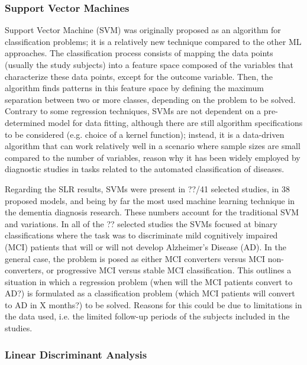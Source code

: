 \subsubsection{Support Vector Machines}
Support Vector Machine (SVM) was originally proposed as an algorithm for classification problems; it is a relatively new technique compared to the other ML approaches. The classification process consists of mapping the data points (usually the study subjects) into a feature space composed of the variables that characterize these data points, except for the outcome variable. Then, the algorithm finds patterns in this feature space by defining the maximum separation between two or more classes, depending on the problem to be solved. Contrary to some regression techniques, SVMs are not dependent on a pre-determined model for data fitting, although there are still algorithm specifications to be considered (e.g. choice of a kernel function); instead, it is a data-driven algorithm that can work relatively well in a scenario where sample sizes are small compared to the number of variables, reason why it has been widely employed by diagnostic studies in tasks related to the automated classification of diseases. 
\par 
Regarding the SLR results, SVMs were present in ??/41 selected studies, in 38 proposed models, and being by far the most used machine learning technique in the dementia diagnosis research. These numbers account for the traditional SVM and variations. In all of the ?? selected studies the SVMs focused at binary classifications where the task was to discriminate mild cognitively impaired (MCI) patients that will or will not develop Alzheimer's Disease (AD). In the general case, the problem is posed as either MCI converters versus MCI non-converters, or progressive MCI versus stable MCI classification. This outlines a situation in which a regression problem (when will the MCI patients convert to AD?) is formulated as a classification problem (which MCI patients will convert to AD in X months?) to be solved. Reasons for this could be due to limitations in the data used, i.e. the limited follow-up periods of the subjects included in the studies.

\subsubsection{Linear Discriminant Analysis}


